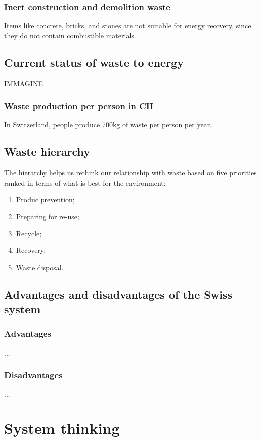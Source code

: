 \documentclass{article}
\begin{document}
\subsubsection{Inert construction and demolition waste}
Items like concrete, bricks, and stones are not suitable for energy recovery,
since they do not contain combustible materials.

\subsection{Current status of waste to energy}
IMMAGINE

\subsubsection{Waste production per person in CH}
In Switzerland, people produce 700kg of waste per person per year.

\subsection{Waste hierarchy}
The hierarchy helps us rethink our relationship with waste based on
five priorities ranked in terms of what is best for the environment:

\begin{enumerate}
    \item Produc prevention;
    \item Preparing for re-use;
    \item Recycle;
    \item Recovery;
    \item Waste disposal.
\end{enumerate}

\subsection{Advantages and disadvantages of the Swiss system}
\subsubsection{Advantages}
...

\subsubsection{Disadvantages}
...

\section{System thinking}
\end{document}
